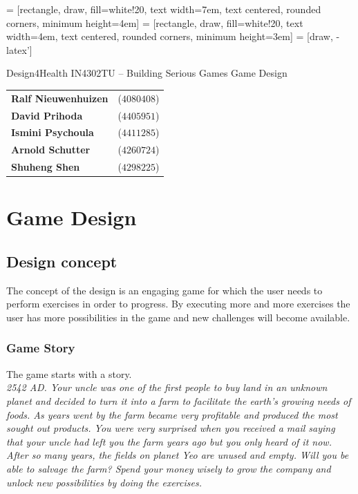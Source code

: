 \documentclass[a4paper,11pt,notitlepage]{report}
\begin{document}
 = [rectangle, draw, fill=white!20, 
    text width=7em, text centered, rounded corners, minimum height=4em]
 = [rectangle, draw, fill=white!20, 
    text width=4em, text centered, rounded corners, minimum height=3em]
 = [draw, -latex']
		
\begin{center}
\vskip 1cm
{\Huge Design4Health \vskip 2mm}
{\Large IN4302TU -- Building Serious Games \vskip 1cm}
{\Huge Game Design \vskip 1cm}

\begin{tabular}{ l l }
\textbf{Ralf Nieuwenhuizen} & ($4080408$) \\
\textbf{David Prihoda} & ($4405951$) \\
\textbf{Ismini Psychoula} & ($4411285$) \\ 
\textbf{Arnold Schutter} & ($4260724$) \\ 
\textbf{Shuheng Shen} & ($4298225$)
\end{tabular} 

\end{center}


\chapter{Game Design}

\section{Design concept}
The concept of the design is an engaging game for which the user needs to perform exercises in order to progress. By executing more and more exercises the user has more possibilities in the game and new challenges will become available. 

\subsection{Game Story}
The game starts with a story. 
\\
\textit{2542 AD. Your uncle was one of the first people to buy land in an unknown planet and decided to turn it into a farm to facilitate the earth’s growing needs of foods. As years went by the farm became very profitable and produced the most sought out products. You were very surprised when you received a mail saying that your uncle had left you the farm years ago but you only heard of it now. After so many years, the fields on planet Yeo are unused and empty. Will you be able to salvage the farm? Spend your money wisely to grow the company and unlock new possibilities by doing the exercises.}
\end{document}
